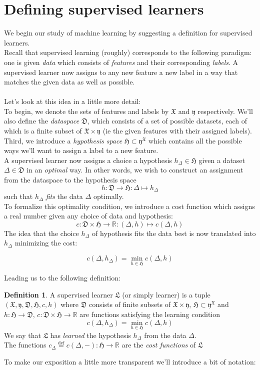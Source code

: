 \documentclass{book}
\theoremstyle{plain}
\theoremstyle{definition}
\newtheorem{definition}[corollary]{Definition}
\renewcommand{\d}[1]{\mathbb{#1}}
\newcommand{\define}{\stackrel{\operatorname{def}}{=}}
\newcommand{\f}[1]{\mathfrak{#1}}
\newcommand{\fun}{\mapsto}
\newcommand{\mor}{\longrightarrow}
\begin{document}
\section{Defining supervised learners}
We begin our study of machine learning by suggesting a definition for supervised learners.\\
Recall that supervised learning (roughly) corresponds to the following paradigm: one is given \emph{data} which consists of \emph{features} and their corresponding \emph{labels}. A supervised learner now assigns to any new feature a new label in a way that matches the given data as well as possible.\\\\
Let's look at this idea in a little more detail:\\ 
To begin, we denote the sets of features and labels by $\f{X}$ and $\f{y}$ respectively. We'll also define the \emph{dataspace} $\f{D}$, which consists of a set of possible datasets, each of which is a finite subset of $\f{X}\times \f{y}$ (ie the given features with their assigned labels). Third, we introduce a \emph{hypothesis space} $\f{H}\subset \f{y}^\f{X}$ which contains all the possible ways we'll want to assign a label to a new feature.\\
A supervised learner now assigns a choice a hypothesis $h_\Delta \in \f{H}$ given a dataset $\Delta \in \f{D}$ in an \emph{optimal} way. In other words, we wish to construct an assignment from the dataspace to the hypothesis space
\[
h:\f{D}\mor \f{H}: \Delta\fun h_\Delta
\]
such that $h_\Delta$ \emph{fits} the data $\Delta$ optimally.\\ To formalize this optimality condition, we introduce a cost function which assigns a real number given any choice of data and hypothesis:
\[c: \f{D}\times \f{H}\mor \d{R}: (\Delta,h)\fun c(\Delta,h) \]
The idea that the choice $h_\Delta$ of hypothesis fits the data best is now translated into $h_\Delta$ minimizing the cost:

\begin{equation} \label{eq:learningcondition}
	c(\Delta,h_\Delta)=\min_{h\in \f{H}} c(\Delta,h)
\end{equation}

\noindent Leading us to the following definition:


\begin{definition}\label{sl:def:supervisedlearner}
A supervised learner  $\f{L}$ (or simply learner) is a tuple $(\f{X},\f{y},\f{D},\f{H},c,h)$ where $\f{D}$ consists of finite subsets of $\f{X}\times \f{y}$,  $\f{H}\subset \f{y}^{\f{X}}$  and $h:\f{H}\mor \f{D}$, $c: \f{D}\times \f{H}\mor \d{R}$ are functions satisfying the learning condition
\[
	c(\Delta,h_\Delta)=\min_{h\in \f{H}} c(\Delta,h)
\]
We say that $\f{L}$ has \emph{learned} the hypothesis $h_\Delta$ from the data $\Delta$.\\
The functions $c_\Delta\define c(\Delta,-): \f{H}\mor \d{R}$ are the \emph{cost functions} of $\f{L}$
\end{definition}
\noindent To make our exposition a little more transparent we'll introduce a bit of notation: 
\end{document}
